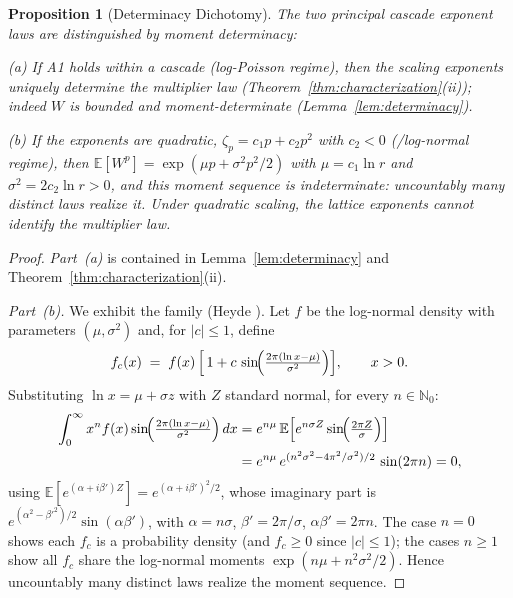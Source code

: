 \documentclass[pdflatex,sn-mathphys-num]{sn-jnl}
\theoremstyle{thmstyleone}
\newtheorem{proposition}[theorem]{Proposition}
\theoremstyle{thmstyletwo}
\theoremstyle{thmstylethree}
\begin{document}
\begin{proposition}[Determinacy Dichotomy]\label{prop:determinacy}
The two principal cascade exponent laws are distinguished by moment
determinacy:

\textup{(a)} If A1 holds within a cascade (log-Poisson regime), then
the scaling exponents uniquely determine the multiplier law
(Theorem~\textup{\ref{thm:characterization}(ii)}); indeed $W$ is
bounded and moment-determinate
(Lemma~\textup{\ref{lem:determinacy}}).

\textup{(b)} If the exponents are quadratic, $\zeta_p = c_1 p +
c_2 p^2$ with $c_2 < 0$ (\textup{\cite{K62}}/log-normal regime),
then $\mathbb{E}[W^p] = \exp(\mu p + \sigma^2 p^2/2)$ with $\mu =
c_1\ln r$ and $\sigma^2 = 2c_2\ln r > 0$, and this moment sequence is
indeterminate: uncountably many distinct laws realize it.  Under
quadratic scaling, the lattice exponents cannot identify the
multiplier law.
\end{proposition}

\begin{proof}
\textit{Part~\textup{(a)}} is contained in
Lemma~\ref{lem:determinacy} and
Theorem~\ref{thm:characterization}(ii).

\textit{Part~\textup{(b)}.}  We exhibit the family (Heyde
\cite{Hey63}).  Let $f$ be the log-normal density with parameters
$(\mu, \sigma^2)$ and, for $|c| \le 1$, define
\[
  f_c(x) \;=\; f(x)\,\Bigl[\,1 + c\,
  \sin\!\Bigl(\tfrac{2\pi(\ln x - \mu)}{\sigma^2}\Bigr)\Bigr],
  \qquad x > 0 .
\]
Substituting $\ln x = \mu + \sigma z$ with $Z$ standard normal, for
every $n \in \mathbb{N}_0$:
\[
\begin{aligned}
  \int_0^\infty x^n f(x)
  \sin\!\Bigl(\tfrac{2\pi(\ln x-\mu)}{\sigma^2}\Bigr)\,dx
  &= e^{n\mu}\,\mathbb{E}\Bigl[e^{n\sigma Z}
    \sin\!\Bigl(\tfrac{2\pi Z}{\sigma}\Bigr)\Bigr]\\
  &= e^{n\mu}\, e^{(n^2\sigma^2 - 4\pi^2/\sigma^2)/2}\,
    \sin(2\pi n) = 0,
\end{aligned}
\]
using $\mathbb{E}[e^{(\alpha+i\beta')Z}] = e^{(\alpha+i\beta')^2/2}$,
whose imaginary part is $e^{(\alpha^2-\beta'^2)/2}\allowbreak\sin(\alpha\beta')$,
with $\alpha = n\sigma$, $\beta' = 2\pi/\sigma$, $\alpha\beta' =
2\pi n$.  The case $n = 0$ shows each $f_c$ is a probability density
(and $f_c \ge 0$ since $|c| \le 1$); the cases $n \ge 1$ show all
$f_c$ share the log-normal moments $\exp(n\mu + n^2\sigma^2/2)$.
Hence uncountably many distinct laws realize the moment sequence.
\end{proof}
\end{document}
